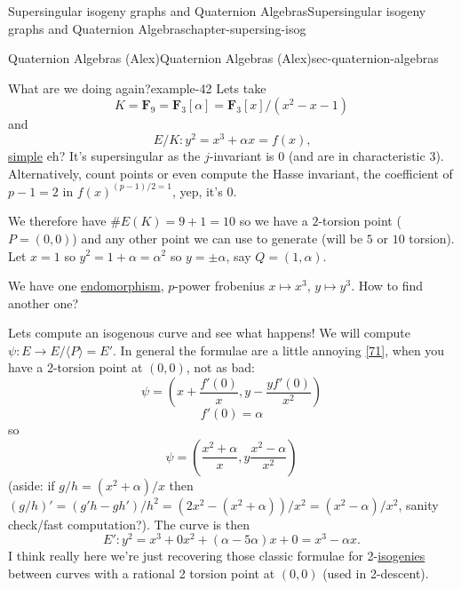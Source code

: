 \documentclass[oneside,10pt,]{book}
\numberwithin{equation}{section}
\newcommand{\FF}{\mathbf{F}}
\begin{document}
\begin{chapterptx}{Supersingular isogeny graphs and Quaternion Algebras}{}{Supersingular isogeny graphs and Quaternion Algebras}{}{}{chapter-supersing-isog}
\begin{sectionptx}{Quaternion Algebras (Alex)}{}{Quaternion Algebras (Alex)}{}{}{sec-quaternion-algebras}
\begin{introduction}{}
\begin{example}{What are we doing again?}{example-42}%
\hypertarget{p-868}{}%
Lets take%
\begin{equation*}
K = \FF_9 = \FF_3[\alpha] = \FF_3[x]/(x^2- x - 1)
\end{equation*}
and%
\begin{equation*}
E/K\colon y^2 = x^3 + \alpha x = f(x)\text{,}
\end{equation*}
\hyperref[def-simple-av]{simple} eh? It's supersingular as the \(j\)-invariant is 0 (and are in characteristic 3). Alternatively, count points or even compute the Hasse invariant, the coefficient of \(p -1 = 2\) in \(f(x)^{(p-1)/2 = 1}\), yep, it's 0.%
\par
\hypertarget{p-869}{}%
We therefore have \(\#E(K) = 9 + 1 = 10\) so we have a \(2\)-torsion point (\(P = (0,0)\)) and any other point we can use to generate (will be \(5\) or \(10\) torsion). Let \(x = 1\) so \(y^2 = 1 + \alpha = \alpha^2\) so \(y = \pm\alpha\), say \(Q = (1,\alpha)\).%
\par
\hypertarget{p-870}{}%
We have one \hyperref[def-supersing-isog-endo]{endomorphism}, \(p\)-power frobenius \(x\mapsto x^3\), \(y\mapsto y^3\). How to find another one?%
\par
\hypertarget{p-871}{}%
Lets compute an isogenous curve and see what happens! We will compute \(\psi\colon  E \to E/\langle P \rangle = E'\). In general the formulae are  a little annoying \hyperlink{bib-velu}{[71]}, when you have a 2-torsion point at \((0,0)\), not as bad:%
\begin{equation*}
\psi = \left(x + \frac{f'(0)}{x}, y - \frac{yf'(0)}{x^2} \right)
\end{equation*}
%
\begin{equation*}
f'(0) = \alpha
\end{equation*}
so%
\begin{equation*}
\psi= \left(\frac{x^2 + \alpha}{x}, y\frac{x^2 - \alpha}{x^2} \right)
\end{equation*}
(aside: if \(g/h = (x^2+\alpha)/x\) then \((g/h)' = (g' h - g h')/h^2 = (2x^2 - (x^2 + \alpha))/x^2 = (x^2 - \alpha)/x^2\), sanity check/fast computation?). The curve is then%
\begin{equation*}
E'\colon y^2 = x^3 + 0x^2 + (\alpha - 5\alpha)x +0 = x^3  - \alpha x\text{.}
\end{equation*}
I think really here we're just recovering those classic formulae for 2-\hyperref[def-supersing-isog-isog]{isogenies} between curves with a rational 2 torsion point at \((0,0)\) (used in 2-descent).%

\end{example}
\end{introduction}
\end{sectionptx}
\end{chapterptx}
\end{document}
